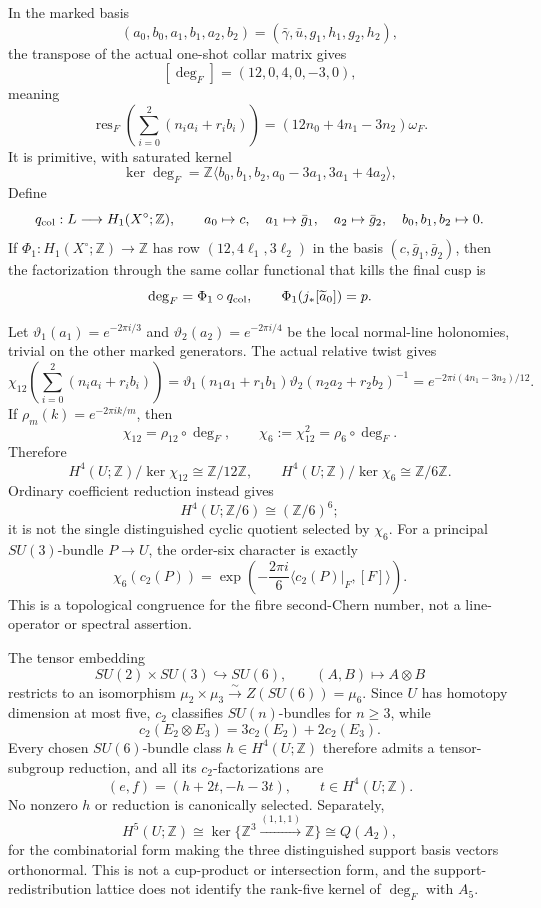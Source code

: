 \begin{enumerate}[leftmargin=1.8em,itemsep=.65em]
In the marked basis
\[
 (a_0,b_0,a_1,b_1,a_2,b_2)
 =(\bar\gamma,\bar u,g_1,h_1,g_2,h_2),
\]
the transpose of the actual one-shot collar matrix gives
\[
 \boxed{[\deg_F]=(12,0,4,0,-3,0)},
\]
meaning
\[
 \operatorname{res}_F\!\left(\sum_{i=0}^2(n_i a_i+r_i b_i)\right)
 =(12n_0+4n_1-3n_2)\omega_F.
\]
It is primitive, with saturated kernel
\[
 \boxed{\ker\deg_F
 =\mathbb Z\langle
 b_0,b_1,b_2,a_0-3a_1,3a_1+4a_2\rangle,}
\]
Define
\[
 q_{\rm col}:L\longrightarrow H_1(X^\circ;\mathbb Z),\qquad
 a_0\mapsto c,\quad a_1\mapsto\bar g_1,\quad a_2\mapsto\bar g_2,\quad
 b_0,b_1,b_2\mapsto0.
\]
If \(\Phi_1:H_1(X^\circ;\mathbb Z)\to\mathbb Z\) has row
\((12,4\ell_1,3\ell_2)\) in the basis \((c,\bar g_1,\bar g_2)\), then the
factorization through the same collar functional that kills the final cusp is
\[
 \deg_F=\Phi_1\circ q_{\rm col},\qquad
 \Phi_1(j_*[\widetilde a_0])=p.
\]

Let \(\vartheta_1(a_1)=e^{-2\pi i/3}\) and
\(\vartheta_2(a_2)=e^{-2\pi i/4}\) be the local normal-line holonomies,
trivial on the other marked generators.  The actual relative twist gives
\[
 \chi_{12}\!\left(\sum_{i=0}^2(n_i a_i+r_i b_i)\right)
 =\vartheta_1(n_1a_1+r_1b_1)
  \vartheta_2(n_2a_2+r_2b_2)^{-1}
 =e^{-2\pi i(4n_1-3n_2)/12}.
\]
If \(\rho_m(k)=e^{-2\pi ik/m}\), then
\[
 \boxed{\chi_{12}=\rho_{12}\circ\deg_F,\qquad
        \chi_6:=\chi_{12}^2=\rho_6\circ\deg_F.}
\]
Therefore
\[
 H^4(U;\mathbb Z)/\ker\chi_{12}\cong\mathbb Z/12\mathbb Z,
 \qquad
 H^4(U;\mathbb Z)/\ker\chi_6\cong\mathbb Z/6\mathbb Z.
\]
Ordinary coefficient reduction instead gives
\[
 H^4(U;\mathbb Z/6)\cong(\mathbb Z/6)^6;
\]
it is not the single distinguished cyclic quotient selected by \(\chi_6\).
For a principal \(SU(3)\)-bundle \(P\to U\), the order-six character is
exactly
\[
 \chi_6(c_2(P))
 =\exp\!\left(-\frac{2\pi i}{6}
 \langle c_2(P)|_F,[F]\rangle\right).
\]
This is a topological congruence for the fibre second-Chern number, not a
line-operator or spectral assertion.

The tensor embedding
\[
 SU(2)\times SU(3)\hookrightarrow SU(6),\qquad
 (A,B)\longmapsto A\otimes B
\]
restricts to an isomorphism
\(\mu_2\times\mu_3\xrightarrow{\sim}Z(SU(6))=\mu_6\).  Since \(U\) has
homotopy dimension at most five, \(c_2\) classifies \(SU(n)\)-bundles for
\(n\ge3\), while
\[
 c_2(E_2\otimes E_3)=3c_2(E_2)+2c_2(E_3).
\]
Every chosen \(SU(6)\)-bundle class \(h\in H^4(U;\mathbb Z)\) therefore
admits a tensor-subgroup reduction, and all its \(c_2\)-factorizations are
\[
 (e,f)=(h+2t,-h-3t),\qquad t\in H^4(U;\mathbb Z).
\]
No nonzero \(h\) or reduction is canonically selected.  Separately,
\[
 H^5(U;\mathbb Z)
 \cong\ker\{\mathbb Z^3\xrightarrow{(1,1,1)}\mathbb Z\}
 \cong Q(A_2),
\]
for the combinatorial form making the three distinguished support basis
vectors orthonormal.  This is not a cup-product or intersection form, and
the support-redistribution lattice does not identify the rank-five kernel of
\(\deg_F\) with \(A_5\).


\end{enumerate}
